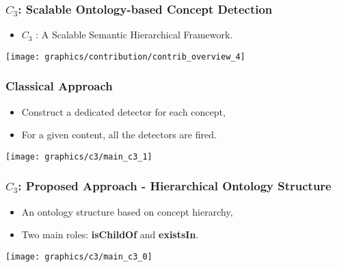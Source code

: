 \begin{frame}
	\frametitle{$C_{3}$: Scalable Ontology-based Concept Detection}
	 {\small
	\begin{itemize}
 	  \item $C_{3}$ : A Scalable Semantic \alert{Hierarchical} Framework.
 	  \end{itemize}
	}
	\begin{center}\hspace*{-1cm} \texttt{[image: graphics/contribution/contrib\_overview\_4]} \end{center}

\end{frame}


\begin{frame}
	\frametitle{Classical Approach}
	\begin{block}{}
	 \begin{itemize}
	  \item Construct a \alert{dedicated} detector for each concept,
	  \item For a given content, all the detectors are fired.
	 \end{itemize}
	\end{block}
	\hspace*{-1cm}\centering\texttt{[image: graphics/c3/main\_c3\_1]}
\end{frame}

\begin{frame}
	\frametitle{$C_{3}$: Proposed Approach - Hierarchical Ontology Structure}
	\begin{block}{}
	 \begin{itemize}
	  \item An ontology structure based on concept \alert{hierarchy}, 
	  \item Two main roles: \textbf{isChildOf} and \textbf{existsIn}.
	 \end{itemize}
	\end{block}
	\hspace*{-1cm}\centering\texttt{[image: graphics/c3/main\_c3\_0]}
\end{frame}

